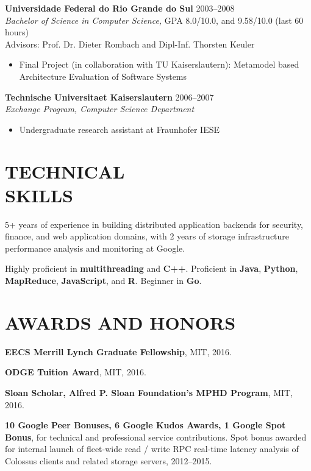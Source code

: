 \documentclass[line,margin]{res}
\begin{document}
\begin{resume}
                \textbf{Universidade Federal do Rio Grande do Sul} \hfill 2003--2008 \\
                {\sl Bachelor of Science in Computer Science,} GPA 8.0/10.0, and 9.58/10.0 (last 60 hours) \\
                Advisors: Prof. Dr. Dieter Rombach and Dipl-Inf. Thorsten Keuler
                \begin{itemize}  \itemsep -2pt
                \item  Final Project (in collaboration with TU Kaiserslautern): Metamodel based Architecture Evaluation of Software Systems
                \end{itemize}
 
                 \textbf{Technische Universitaet Kaiserslautern} \hfill 2006--2007 \\
                {\sl Exchange Program, Computer Science Department}
                \begin{itemize}  \itemsep -2pt
                \item  Undergraduate research assistant at Fraunhofer IESE
                \end{itemize} 
                
 
\section{TECHNICAL \\ SKILLS} 5+ years of experience in building distributed application backends for security, finance, and web application domains, with 2 years of storage infrastructure performance analysis and monitoring at Google.

Highly proficient in \textbf{multithreading} and \textbf{C++}.  Proficient in \textbf{Java}, \textbf{Python}, \textbf{MapReduce}, \textbf{JavaScript}, and \textbf{R}.  Beginner in \textbf{Go}.
 
\section{AWARDS AND HONORS}

\textbf{EECS Merrill Lynch Graduate Fellowship}, MIT, 2016.

\textbf{ODGE Tuition Award}, MIT, 2016.

  \textbf{Sloan Scholar, Alfred P. Sloan Foundation's MPHD Program}, MIT, 2016.

\textbf{10 Google Peer Bonuses, 6 Google Kudos Awards, 1 Google Spot Bonus}, for technical and professional service contributions.  Spot bonus awarded for internal launch of fleet-wide read / write RPC real-time latency analysis of Colossus clients and related storage servers, 2012--2015.


\end{resume}
\end{document}
